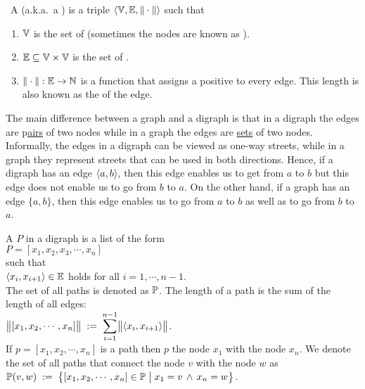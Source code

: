 \begin{Definition} \
  A  (a.k.a.~a ) is a triple 
  $\langle {\mathbb V}, {\mathbb E}, \|\cdot\| \rangle$ such that
  \begin{enumerate}
  \item ${\mathbb V}$ is the set of  (sometimes the nodes are known as ).
  \item ${\mathbb E} \subseteq {\mathbb V} \times {\mathbb V}$ is the set of \blue{edges}.
  \item $\|\cdot\|: {\mathbb E} \rightarrow {\mathbb N}$ is a function that assigns a positive  
        to every edge.  This length is also known as the \blue{weight} of the edge.
        \eox
  \end{enumerate}
\end{Definition}

\remark
The main difference between a graph and a digraph is that in a digraph the edges are 
\mbox{p\hspace{-0.15cm}\underline{\hspace{0.15cm}airs}} of two
nodes while in a graph the edges are \underline{sets} of two nodes.  Informally, the edges in a
digraph can be viewed as one-way streets, while in a graph they represent streets that can be used in both
directions.  Hence, if a digraph has an edge $\pair(a,b)$, then this edge enables us to get from $a$ to $b$ but
this edge does not enable us to go from $b$ to $a$.  On the other hand, if a graph has an edge $\{a,b\}$, then
this edge enables us to go from $a$ to $b$ as well as to go from $b$ to $a$.
\eox

\begin{Definition}
 A  $P$ in a digraph is a list of the form 
\\[0.2cm]
\hspace*{1.3cm} 
$P = [ x_1, x_2, x_3, \cdots, x_n ]$ 
\\[0.2cm]
such that
\\[0.2cm]
\hspace*{1.3cm} $\pair(x_i,x_{i+1}) \in \edges$ \quad holds for all $i = 1, \cdots, n-1$. 
\\[0.2cm]
The set of all paths is denoted as ${\mathbb P}$.
The length of a path is the sum of the length of all edges:
\\[0.2cm]
\hspace*{1.3cm}
$\ds\Weight{[x_1,x_2, \cdots, x_n]} \df \sum\limits_{i=1}^{n-1} \Weight{\pair(x_i,x_{i+1})}$. 
\\[0.2cm]
If  $p = [x_1, x_2, \cdots, x_n]$ is a path then  $p$  the node $x_1$ with the node
$x_n$.  We denote the set of all paths that connect the node $v$ with the node $w$ as
\\[0.2cm]
\hspace*{1.3cm} 
 ${\mathbb P}(v,w) \;:=\; \bigl\{ [x_1, x_2, \cdots, x_n] \in {\mathbb P} \bigm| x_1 = v \,\wedge\, x_n = w \bigr\}$.
\end{Definition}

